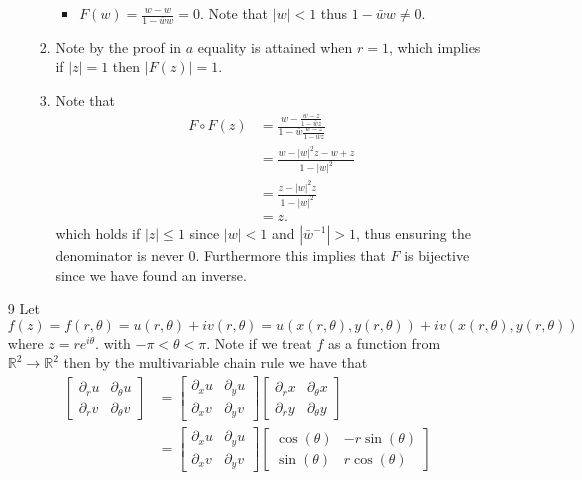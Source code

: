 \documentclass[12pt, letterpaper]{article}
\newcommand{\R}{\mathbb{R}}
\begin{document}
\begin{enumerate}
\begin{enumerate}
\begin{enumerate}
\begin{itemize}
				\item $F(w) = \frac{w - w}{1 - \bar{w}w} = 0$.  Note that $|w | < 1$ thus $1-\bar{w}w \neq 0$.
			\end{itemize}
			\item Note by the proof in $a$ equality is attained when $r = 1$, which implies if $|z| = 1$ then 
			$|F(z)|= 1$.
			\item Note that 
			\begin{align*}
			F \circ F(z) &= \frac{w - \frac{w - z}{1 - \bar{w} z}}{1 - \bar{w} \frac{w - z}{1 - \bar{w} z}}\\
			&= \frac{w - |w|^2 z - w + z}{1 - |w|^2}\\
			&= \frac{z - |w|^2z}{1 - |w|^2}\\
			&= z.
			\end{align*}
			which holds if $|z| \leq 1$ since $|w| < 1$ and $|\bar{w}^{-1}| > 1$,
			thus ensuring the denominator is never 0.  
			Furthermore this implies that $F$ is bijective since we have found an inverse.
		\end{enumerate}
	\end{enumerate}
	\item[9] Let $f(z) = f(r,\theta) = u(r,\theta) + i v(r,\theta) = u(x(r,\theta),y(r,\theta)) + i v(x(r,\theta),y(r,\theta))$ where $z = re^{i\theta}$.  
	with $- \pi < \theta < \pi$.  Note if we treat 
	$f$ as a function from $\R^2 \to \R^2$ then by the multivariable chain rule we have that
	\begin{align*}
	\begin{bmatrix}
	 \partial_r u & \partial_\theta u\\
	 \partial_r v & \partial_\theta v
	\end{bmatrix} &= \begin{bmatrix}
	\partial_x u & \partial_y u\\
	\partial_x v & \partial_y v
	\end{bmatrix}
	\begin{bmatrix}
	\partial_rx & \partial_\theta x\\
	\partial_ry & \partial_\theta y
	\end{bmatrix}\\
	&= 
	\begin{bmatrix}
	\partial_x u & \partial_y u\\
	\partial_x v & \partial_y v
	\end{bmatrix}	 
	\begin{bmatrix}
	\cos(\theta) & -r \sin(\theta)\\
	\sin(\theta) & r \cos(\theta)

\end{bmatrix}
\end{align*}
\end{enumerate}
\end{document}
